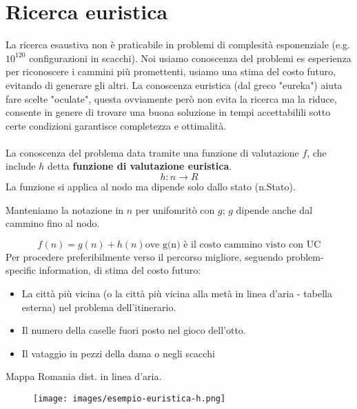\newpage
\section{Ricerca euristica}
La ricerca esaustiva non è praticabile in problemi di complesità esponenziale (e.g. $10^120$ configurazioni in scacchi). Noi usiamo
conoscenza del problemi es esperienza per riconoscere i cammini più promettenti, usiamo una stima del costo futuro, evitando di generare gli altri.
La conoscenza euristica (dal greco "eureka") aiuta fare scelte "oculate", questa ovviamente però non evita la ricerca ma la riduce, consente in
genere di trovare una buona soluzione in tempi accettabilili sotto certe condizioni garantisce completezza e ottimalità.\\\\
La conoscenza del problema data tramite una funzione di valutazione $f$, che include $h$ detta \textbf{funzione di valutazione euristica}.
$$h: n \to R$$
La funzione si applica al nodo ma dipende solo dallo stato (n.Stato).
\begin{note}
    Manteniamo la notazione in $n$ per unifomritò con $g$; $g$ dipende anche dal cammino fino al nodo.
\end{note}
$$f(n) = g(n) + h(n) \text{ove g(n) è il costo cammino visto con UC}$$
Per procedere preferibilmente verso il percorso migliore, seguendo problem-specific information, di stima del costo futuro:
\begin{itemize}
    \item La città più vicina (o la città più vicina alla metà in linea d'aria - tabella esterna) nel problema dell'itinerario.
    \item Il numero della caselle fuori posto nel gioco dell'otto.
    \item Il vataggio in pezzi della dama o negli scacchi
\end{itemize}

\begin{example}
    Mappa Romania dist. in linea d'aria.
    \begin{figure}[h!]
        \centering
        \texttt{[image: images/esempio-euristica-h.png]}
    \end{figure}
\end{example}

